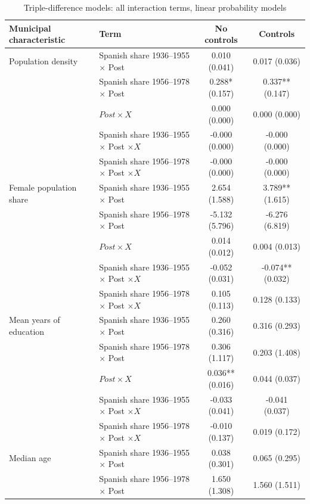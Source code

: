 \begin{table}[!htbp]
\small
\renewcommand{\arraystretch}{1}
\setlength{\tabcolsep}{3pt}
\centering
\caption{Triple-difference models: all interaction terms, linear probability models}
\label{tab:triple_all_interactions_lpm_stata}
\captionsetup{justification=centering}
\begin{tabular}{llcc}
\hline
Municipal characteristic & Term & No controls & Controls \\
\hline
Population density & Spanish share 1936--1955 \(\times\) Post & 0.010 (0.041) & 0.017 (0.036) \\
 & Spanish share 1956--1978 \(\times\) Post & 0.288* (0.157) & 0.337** (0.147) \\
 & \(Post \times X\) & 0.000 (0.000) & 0.000 (0.000) \\
 & Spanish share 1936--1955 \(\times\) Post \(\times X\) & -0.000 (0.000) & -0.000 (0.000) \\
 & Spanish share 1956--1978 \(\times\) Post \(\times X\) & -0.000 (0.000) & -0.000 (0.000) \\
\addlinespace
Female population share & Spanish share 1936--1955 \(\times\) Post & 2.654 (1.588) & 3.789** (1.615) \\
 & Spanish share 1956--1978 \(\times\) Post & -5.132 (5.796) & -6.276 (6.819) \\
 & \(Post \times X\) & 0.014 (0.012) & 0.004 (0.013) \\
 & Spanish share 1936--1955 \(\times\) Post \(\times X\) & -0.052 (0.031) & -0.074** (0.032) \\
 & Spanish share 1956--1978 \(\times\) Post \(\times X\) & 0.105 (0.113) & 0.128 (0.133) \\
\addlinespace
Mean years of education & Spanish share 1936--1955 \(\times\) Post & 0.260 (0.316) & 0.316 (0.293) \\
 & Spanish share 1956--1978 \(\times\) Post & 0.306 (1.117) & 0.203 (1.408) \\
 & \(Post \times X\) & 0.036** (0.016) & 0.044 (0.037) \\
 & Spanish share 1936--1955 \(\times\) Post \(\times X\) & -0.033 (0.041) & -0.041 (0.037) \\
 & Spanish share 1956--1978 \(\times\) Post \(\times X\) & -0.010 (0.137) & 0.019 (0.172) \\
\addlinespace
Median age & Spanish share 1936--1955 \(\times\) Post & 0.038 (0.301) & 0.065 (0.295) \\
 & Spanish share 1956--1978 \(\times\) Post & 1.650 (1.308) & 1.560 (1.511) \\

\end{tabular}
\end{table}
